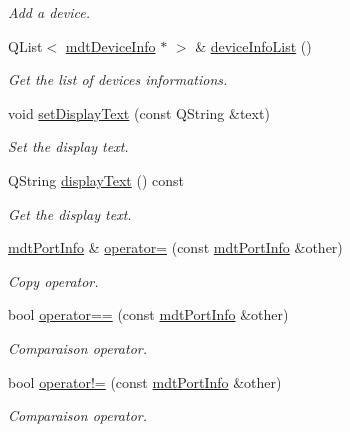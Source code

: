 \begin{DoxyCompactItemize}
\begin{DoxyCompactList}\small\item\em Add a device. \end{DoxyCompactList}\item 
QList$<$ \hyperlink{classmdt_device_info}{mdtDeviceInfo} $\ast$ $>$ \& \hyperlink{classmdt_port_info_a22013ea9e2de1d12cef673a2452d5b80}{deviceInfoList} ()
\begin{DoxyCompactList}\small\item\em Get the list of devices informations. \end{DoxyCompactList}\item 
void \hyperlink{classmdt_port_info_aad09e261bafcdc72ef6b2479ec37fbe8}{setDisplayText} (const QString \&text)
\begin{DoxyCompactList}\small\item\em Set the display text. \end{DoxyCompactList}\item 
QString \hyperlink{classmdt_port_info_a38bcac67372782228a91d8e7dbf49211}{displayText} () const 
\begin{DoxyCompactList}\small\item\em Get the display text. \end{DoxyCompactList}\item 
\hypertarget{classmdt_port_info_a88bab5da09191b1ecfbb0b11f001ad24}{
\hyperlink{classmdt_port_info}{mdtPortInfo} \& \hyperlink{classmdt_port_info_a88bab5da09191b1ecfbb0b11f001ad24}{operator=} (const \hyperlink{classmdt_port_info}{mdtPortInfo} \&other)}
\label{classmdt_port_info_a88bab5da09191b1ecfbb0b11f001ad24}

\begin{DoxyCompactList}\small\item\em Copy operator. \end{DoxyCompactList}\item 
bool \hyperlink{classmdt_port_info_a72b265f3461d764d0e902c421e3b43e4}{operator==} (const \hyperlink{classmdt_port_info}{mdtPortInfo} \&other)
\begin{DoxyCompactList}\small\item\em Comparaison operator. \end{DoxyCompactList}\item 
\hypertarget{classmdt_port_info_a8a198e8693bb328194ac7bba4a29271e}{
bool \hyperlink{classmdt_port_info_a8a198e8693bb328194ac7bba4a29271e}{operator!=} (const \hyperlink{classmdt_port_info}{mdtPortInfo} \&other)}
\label{classmdt_port_info_a8a198e8693bb328194ac7bba4a29271e}

\begin{DoxyCompactList}\small\item\em Comparaison operator. \end{DoxyCompactList}\end{DoxyCompactItemize}


